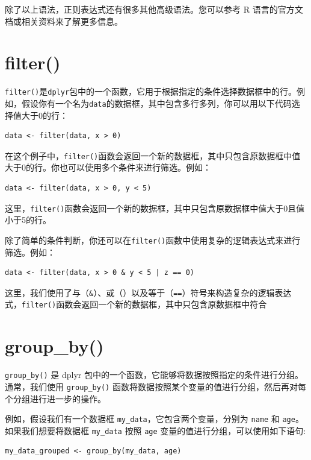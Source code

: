 \documentclass[
  letterpaper,
  DIV=11,
  numbers=noendperiod]{scrreprt}
\begin{document}
除了以上语法，正则表达式还有很多其他高级语法。您可以参考 R
语言的官方文档或相关资料来了解更多信息。

\hypertarget{filter}{%
\section{filter()}\label{filter}}

\texttt{filter()}是\texttt{dplyr}包中的一个函数，它用于根据指定的条件选择数据框中的行。例如，假设你有一个名为\texttt{data}的数据框，其中包含多行多列，你可以用以下代码选择值大于0的行：

\begin{verbatim}
data <- filter(data, x > 0)
\end{verbatim}

在这个例子中，\texttt{filter()}函数会返回一个新的数据框，其中只包含原数据框中值大于0的行。你也可以使用多个条件来进行筛选。例如：

\begin{verbatim}
data <- filter(data, x > 0, y < 5)
\end{verbatim}

这里，\texttt{filter()}函数会返回一个新的数据框，其中只包含原数据框中值大于0且值小于5的行。

除了简单的条件判断，你还可以在\texttt{filter()}函数中使用复杂的逻辑表达式来进行筛选。例如：

\begin{verbatim}
data <- filter(data, x > 0 & y < 5 | z == 0)
\end{verbatim}

这里，我们使用了与（\texttt{\&}）、或（\texttt{\textbar{}}）以及等于（\texttt{==}）符号来构造复杂的逻辑表达式，\texttt{filter()}函数会返回一个新的数据框，其中只包含原数据框中符合

\hypertarget{group_by}{%
\section{group\_by()}\label{group_by}}

\texttt{group\_by()} 是 dplyr
包中的一个函数，它能够将数据按照指定的条件进行分组。通常，我们使用
\texttt{group\_by()}
函数将数据按照某个变量的值进行分组，然后再对每个分组进行进一步的操作。

例如，假设我们有一个数据框 \texttt{my\_data}，它包含两个变量，分别为
\texttt{name} 和 \texttt{age}。如果我们想要将数据框 \texttt{my\_data}
按照 \texttt{age} 变量的值进行分组，可以使用如下语句:

\begin{verbatim}
my_data_grouped <- group_by(my_data, age)
\end{verbatim}
\end{document}
